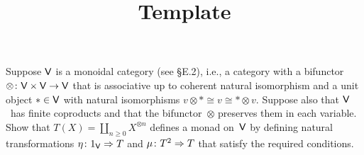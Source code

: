\documentclass[../../solutions]{subfiles}
\title{Template}
\author{}
\begin{document}
\maketitle

%

\begin{exercise}
  Suppose ${\mathsf{V}}$ is a monoidal category (see \S E.2), i.e., a category
  with a bifunctor ${\otimes}\colon{{\mathsf{V}}\times {\mathsf{V}}}\to{{\mathsf{V}}}$ that is
  associative up to coherent natural isomorphism and a unit object
  ${*}\in{\mathsf{V}}$ with natural isomorphisms
  $v\otimes {*} \cong v \cong {*} \otimes v$.  Suppose also that
  ${\mathsf{V}}$~has finite coproducts and that the bifunctor~$\otimes$
  preserves them in each variable.  Show that
  $T(X) = \coprod_{n\ge0} X^{\otimes n}$ defines a monad on~${\mathsf{V}}$ by
  defining natural transformations ${\eta}\colon{1_{\mathsf{V}}}\Rightarrow{T}$ and
  ${\mu}\colon{T^2}\Rightarrow{T}$ that satisfy the required conditions.
\end{exercise}
\end{document}
